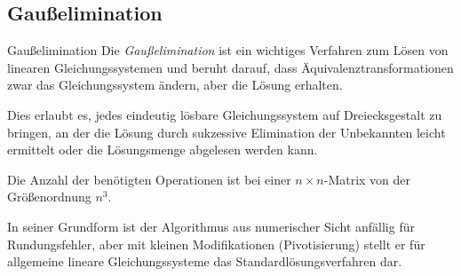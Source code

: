 \subsection{Gaußelimination}

\begin{defi}{Gaußelimination}
    Die \emph{Gaußelimination} ist ein wichtiges Verfahren zum Lösen von linearen Gleichungssystemen und beruht darauf, dass Äquivalenztransformationen zwar das Gleichungssystem ändern, aber die Lösung erhalten.

    Dies erlaubt es, jedes eindeutig lösbare Gleichungssystem auf Dreiecksgestalt zu bringen, an der die Lösung durch sukzessive Elimination der Unbekannten leicht ermittelt oder die Lösungsmenge abgelesen werden kann.

    Die Anzahl der benötigten Operationen ist bei einer $n \times n$-Matrix von der Größenordnung $n^3$.

    In seiner Grundform ist der Algorithmus aus numerischer Sicht anfällig für Rundungsfehler, aber mit kleinen Modifikationen (Pivotisierung) stellt er für allgemeine lineare Gleichungssysteme das Standardlösungsverfahren dar.
\end{defi}

